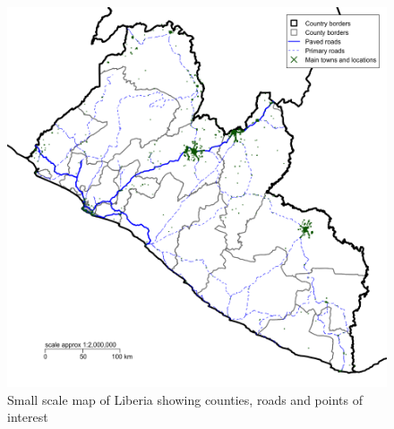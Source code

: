 \documentclass[12pt,a4paper]{book}
\theoremstyle{definition}
\theoremstyle{definition}
\theoremstyle{definition}
\theoremstyle{remark}
\begin{document}
\newpage

\begin{figure}[H]

{\centering \includegraphics{figures/smallScaleMap-1} 

}

\caption{Small scale map of Liberia showing counties, roads and points of interest}\label{fig:smallScaleMap}
\end{figure}\newpage
\end{document}
